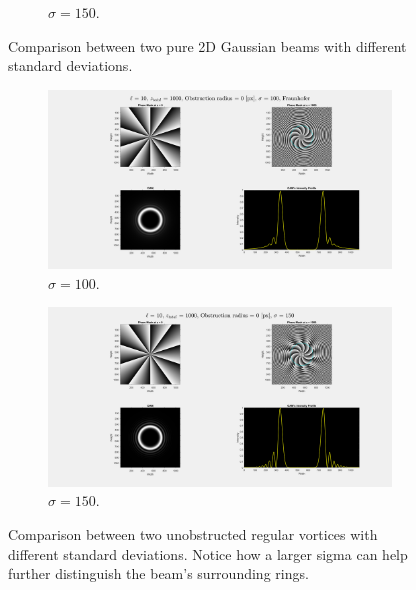 \begin{figure}[htbp]
\begin{subfigure}[b]{0.45\textwidth}
        \caption{$\sigma = 150$.}
    \end{subfigure}
    \caption{Comparison between two pure 2D Gaussian beams with different standard deviations.}
    \label{fig:2D_Gaussian_sigmas}
\end{figure}

\begin{figure}[htbp]
    \centering
    \begin{subfigure}[b]{0.45\textwidth}
        \centering
        \includegraphics[width=\textwidth]{images/Appendices/Additional_Results/Sigma_150/unobs_sigma100.png}
        \caption{$\sigma = 100$.}
    \end{subfigure}
    \hfill
    \begin{subfigure}[b]{0.45\textwidth}
        \centering
        \includegraphics[width=\textwidth]{images/Appendices/Additional_Results/Sigma_150/type=0_r=0_zi=0_zf=1000.png}
        \caption{$\sigma = 150$.}
    \end{subfigure}
    \caption{Comparison between two unobstructed regular vortices with different standard deviations. Notice how a larger sigma can help further distinguish the beam's surrounding rings.}
    \label{fig:reg_sigma100-vs-sigma150}
\end{figure}

